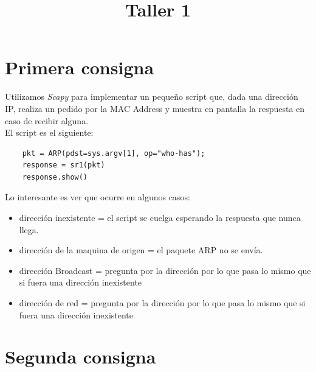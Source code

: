 \documentclass[a4paper]{article}
\title{Taller 1}
\begin{document}


\maketitle

\newpage



\newpage

\section{Primera consigna}

Utilizamos \textit{Scapy} para implementar un pequeño script que, dada una dirección IP, realiza un pedido por la MAC Address y muestra en pantalla la respuesta en caso de recibir alguna.\\

El script es el siguiente:

\begin{verbatim}
	pkt = ARP(pdst=sys.argv[1], op="who-has");
	response = sr1(pkt)
	response.show()
\end{verbatim}

Lo interesante es ver que ocurre en algunos casos:

\begin{itemize}
\item dirección inexistente = el script se cuelga esperando la respuesta que nunca llega. 
\item dirección de la maquina de origen = el paquete ARP no se envía.
\item dirección Broadcast = pregunta por la dirección por lo que pasa lo mismo que si fuera una dirección inexistente 
\item dirección de red = pregunta por la dirección por lo que pasa lo mismo que si fuera una dirección inexistente 
\end{itemize}


\section{Segunda consigna}
\end{document}
